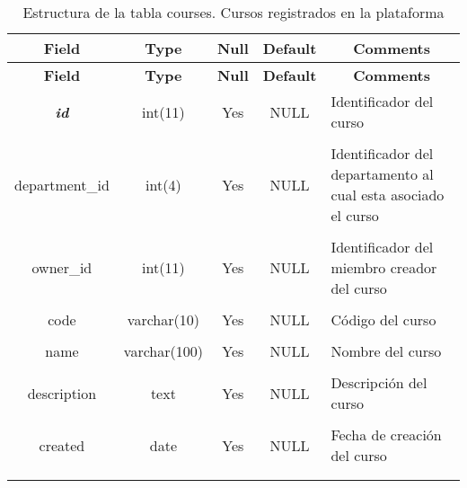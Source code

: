 %
%
\begin{longtable}{c c c c l}
	\multicolumn{1}{c}{\textbf{Field}} &
	\multicolumn{1}{c}{\textbf{Type}} &
	\multicolumn{1}{c}{\textbf{Null}} &
	\multicolumn{1}{c}{\textbf{Default}} &
	\multicolumn{1}{c}{\textbf{Comments}} \\ \hline \hline
\endfirsthead
	\multicolumn{1}{c}{\textbf{Field}} &
	\multicolumn{1}{c}{\textbf{Type}} &
	\multicolumn{1}{c}{\textbf{Null}} &
	\multicolumn{1}{c}{\textbf{Default}} &
	\multicolumn{1}{c}{\textbf{Comments}} \\ \hline \hline
\endhead \endfoot
	\textbf{\textit{id}} & int(11)  & Yes & NULL & \parbox[t]{0.35\textwidth}{Identificador del curso} \\ \\  \hline
	department\_id & int(4)  & Yes & NULL & \parbox[t]{0.35\textwidth}{Identificador del departamento al cual esta asociado el curso} \\ \\  \hline
	owner\_id & int(11) & Yes & NULL & \parbox[t]{0.35\textwidth}{Identificador del miembro creador del curso} \\ \\  \hline
	code & varchar(10) & Yes & NULL & \parbox[t]{0.35\textwidth}{Código del curso} \\ \\  \hline
	name & varchar(100) & Yes & NULL & \parbox[t]{0.35\textwidth}{Nombre del curso} \\ \\  \hline
	description & text & Yes & NULL & \parbox[t]{0.35\textwidth}{Descripción del curso} \\ \\  \hline
	created & date & Yes & NULL & \parbox[t]{0.35\textwidth}{Fecha de creación del curso} \\ \\  \hline
 \caption[Estructura de la tabla courses]{Estructura de la tabla courses. Cursos registrados en la plataforma} \label{tab:courses-structure} \\
\end{longtable}

